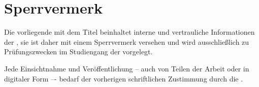 
\chapter*{Sperrvermerk}

\thispagestyle{empty}


Die vorliegende {\art} mit dem Titel \textit{\titel} beinhaltet interne und vertrauliche Informationen der \firma{}, sie ist daher mit einem Sperrvermerk versehen und wird ausschließlich zu Pr\"ufungszwecken im Studiengang {\studienbereich} der \hochschule{} \ort{} vorgelegt.

Jede Einsichtnahme und Ver\"offentlichung -- auch von Teilen der Arbeit oder in digitaler Form –- bedarf der vorherigen schriftlichen Zustimmung durch die {\firma}.